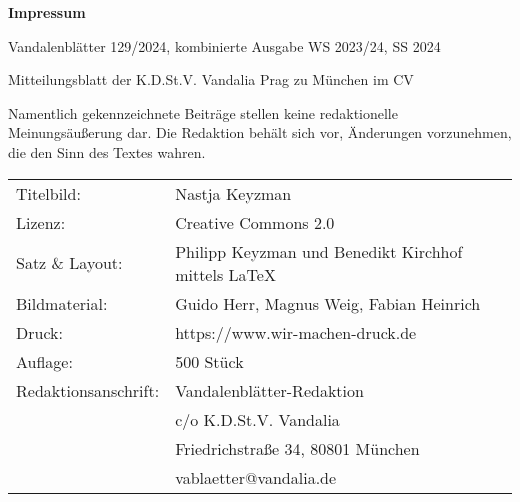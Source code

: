 \vspace*{7mm}
\begin{minipage}[h!]{160mm}
	\small{
		\textbf{Impressum}
		
		Vandalenblätter 129/2024, kombinierte Ausgabe WS 2023/24, SS 2024
		
		Mitteilungsblatt der K.D.St.V. Vandalia Prag zu München im CV
		
		Namentlich gekennzeichnete Beiträge stellen keine redaktionelle Meinungsäußerung dar. Die Redaktion behält sich vor, Änderungen vorzunehmen, die den Sinn des Textes wahren.
		\\
		\vspace{6pt}
		\noindent\begin{tabular}{ll}
			Titelbild: & Nastja Keyzman\\
			Lizenz: & Creative Commons 2.0 \\
			Satz \& Layout: & Philipp Keyzman und Benedikt Kirchhof mittels
			\LaTeX
			\\
			Bildmaterial: & Guido Herr, Magnus Weig, Fabian Heinrich\\
			Druck: & https://www.wir-machen-druck.de\\
			Auflage: & 500 Stück\\
			Redaktionsanschrift: & Vandalenblätter-Redaktion \\	
			& c/o K.D.St.V. Vandalia\\
			& Friedrichstraße 34, 80801 München\\
			& vablaetter@vandalia.de
		\end{tabular}
	}
	
\end{minipage}
\clearpage
